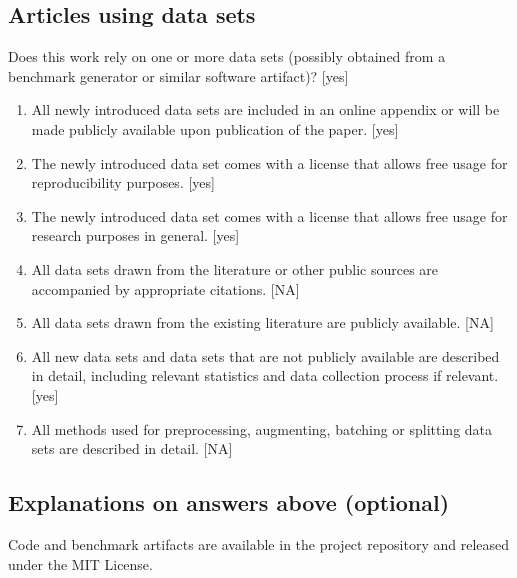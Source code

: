 \documentclass[]{jair}
\begin{document}
\subsection*{Articles using data sets}
Does this work rely on one or more data sets (possibly obtained from a benchmark generator or similar software artifact)? [yes]
\begin{enumerate}
    \item All newly introduced data sets are included in an online appendix or will be made publicly available upon publication of the paper. [yes]
    \item The newly introduced data set comes with a license that allows free usage for reproducibility purposes. [yes]
    \item The newly introduced data set comes with a license that allows free usage for research purposes in general. [yes]
    \item All data sets drawn from the literature or other public sources are accompanied by appropriate citations. [NA]
    \item All data sets drawn from the existing literature are publicly available. [NA]
    \item All new data sets and data sets that are not publicly available are described in detail, including relevant statistics and data collection process if relevant. [yes]
    \item All methods used for preprocessing, augmenting, batching or splitting data sets are described in detail. [NA]
\end{enumerate}

\subsection*{Explanations on answers above (optional)}
Code and benchmark artifacts are available in the project repository and released under the MIT License.
\end{document}
